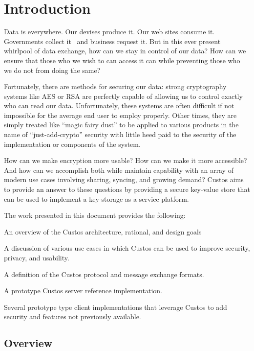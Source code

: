 \chapter{Introduction}
\label{chap:intro}

Data is everywhere. Our devises produce it. Our web sites consume
it. Governments collect it~\cite{GreenwaldPrism} and business request
it. But in this ever present whirlpool of data exchange, how can we
stay in control of our data? How can we ensure that those who we wish
to can access it can while preventing those who we do not from doing
the same?

Fortunately, there are methods for securing our data: strong
cryptography systems like AES or RSA are perfectly capable of allowing
us to control exactly who can read our data. Unfortunately, these
systems are often difficult if not impossible for the average end user
to employ properly. Other times, they are simply treated like ``magic
fairy dust'' to be applied to various products in the name of
``just-add-crypto'' security with little heed paid to the security of
the implementation or components of the system.

How can we make encryption more usable? How can we make it more
accessible? And how can we accomplish both while maintain capability
with an array of modern use cases involving sharing, syncing, and
growing demand? Custos aims to provide an answer to these questions by
providing a secure key-value store that can be used to implement a
key-storage as a service platform.

The work presented in this document provides the following:

\begin{packed_item}
\item An overview of the Custos architecture, rational, and design goals
\item A discussion of various use cases in which Custos can be used to
  improve security, privacy, and usability.
\item A definition of the Custos protocol and message exchange formats.
\item A prototype Custos server reference implementation.
\item Several prototype type client implementations that leverage Custos to
  add security and features not previously available.
\end{packed_item}

\section{Overview}

